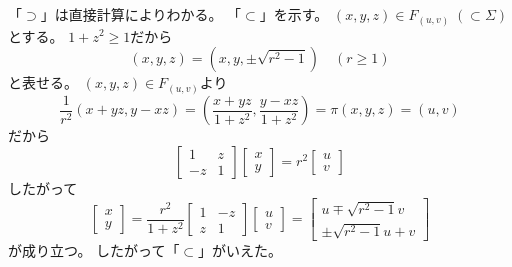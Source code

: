 \documentclass[report]{jlreq}
\begin{document}
\begin{answer}
    「$\supset$」は直接計算によりわかる。
    「$\subset$」を示す。
    $(x, y, z) \in F_{(u, v)} \; (\subset \Sigma)$とする。
    $1 + z^2 \ge 1$だから
    \begin{equation}
        (x, y, z) = (x, y, \pm \sqrt{r^2 - 1})
            \quad
            (r \ge 1)
    \end{equation}
    と表せる。
    $(x, y, z) \in F_{(u, v)}$より
    \begin{equation}
        \frac{1}{r^2} (x + yz, y - xz)
            = \left(
                \frac{x + yz}{1 + z^2},
                \frac{y - xz}{1 + z^2}
            \right)
            = \pi(x, y, z)
            = (u, v)
    \end{equation}
    だから
    \begin{equation}
        \begin{bmatrix}
            1 & z \\
            -z & 1
        \end{bmatrix}
        \begin{bmatrix}
            x \\
            y
        \end{bmatrix}
            = r^2
            \begin{bmatrix}
                u \\
                v
            \end{bmatrix}
    \end{equation}
    したがって
    \begin{equation}
        \begin{bmatrix}
            x \\
            y
        \end{bmatrix}
            = \frac{r^2}{1 + z^2}
            \begin{bmatrix}
                1 & -z \\
                z & 1
            \end{bmatrix}
            \begin{bmatrix}
                u \\
                v
            \end{bmatrix}
            = \begin{bmatrix}
                u \mp \sqrt{r^2 - 1} v \\
                \pm \sqrt{r^2 - 1} u + v
            \end{bmatrix}
    \end{equation}
    が成り立つ。
    したがって「$\subset$」がいえた。


\end{answer}
\end{document}
